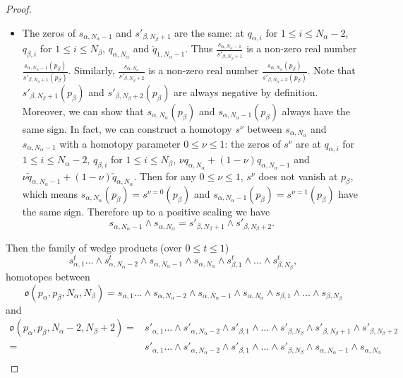 \documentclass[11pt,a4paper]{article}
\theoremstyle{definition}
\theoremstyle{remark}
\numberwithin{equation}{section}
\begin{document}
\begin{proof}
\begin{itemize}
        \item The zeros of $s_{\alpha,N_\alpha-1}$ and $s'_{\beta,N_\beta+1}$ are the same: at $q_{\alpha,i}$ for $1\le i \le N_\alpha-2$, $q_{\beta,i}$ for $1\le i \le N_\beta$, $q_{\alpha,N_\alpha}$ and $\check{q}_{1,N_\alpha-1}$. Thus $\frac{s_{\alpha,N_\alpha-1}}{s'_{\beta,N_\beta+1}}$ is a non-zero real number  $\frac{s_{\alpha,N_\alpha-1}(p_\beta)}{s'_{\beta,N_\beta+1}(p_\beta)}$. Similarly, $\frac{s_{\alpha,N_\alpha}}{s'_{\beta,N_\beta+2}}$ is a non-zero real number  $\frac{s_{\alpha,N_\alpha}(p_\beta)}{s'_{\beta,N_\beta+2}(p_\beta)}$. Note that $s'_{\beta,N_\beta+1}(p_\beta)$ and $s'_{\beta,N_\beta+2}(p_\beta)$ are always negative by definition. 
        Moreover, we can show that $s_{\alpha,N_\alpha}(p_\beta)$ and $s_{\alpha,N_\alpha-1}(p_\beta)$ always have the same sign. In fact, we can construct a homotopy $s^\nu$ between $s_{\alpha,N_\alpha}$ and $s_{\alpha,N_\alpha-1}$ with a homotopy parameter $0\le \nu \le 1$: the zeros of $s^\nu$ are at $q_{\alpha,i}$ for $1\le i \le N_\alpha-2$, $q_{\beta,i}$ for $1\le i \le N_\beta$, $\nu q_{\alpha,N_\alpha}+(1-\nu)q_{\alpha,N_\alpha-1}$ and $\nu\check{q}_{\alpha,N_\alpha-1}+(1-\nu)\check{q}_{\alpha,N_\alpha}$. 
        Then for any $0\le \nu \le 1$, $s^\nu$ does not vanish at $p_\beta$, which means $s_{\alpha,N_\alpha}(p_\beta)=s^{\nu=0}(p_\beta)$ and $s_{\alpha,N_\alpha-1}(p_\beta)=s^{\nu=1}(p_\beta)$ have the same sign. Therefore up to a positive scaling we have
        $$
        s_{\alpha,N_\alpha-1}\wedge s_{\alpha,N_\alpha}=s'_{\beta,N_\beta+1} \wedge s'_{\beta,N_\beta+2}.
        $$
    \end{itemize}
    Then the family of wedge products (over $0\le t \le 1$)
    $$
    s^t_{\alpha,1}\dots \wedge s^t_{\alpha,N_\alpha-2}\wedge s_{\alpha,N_\alpha-1}\wedge s_{\alpha,N_\alpha}\wedge s^t_{\beta,1}\wedge \dots \wedge s^t_{\beta,N_\beta},
    $$
    homotopes between 
    $$\mathfrak o(p_\alpha,p_\beta,N_\alpha,N_\beta)= s_{\alpha,1}\dots \wedge s_{\alpha,N_\alpha-2}\wedge s_{\alpha,N_\alpha-1}\wedge s_{\alpha,N_\alpha}\wedge s_{\beta,1}\wedge \dots \wedge s_{\beta,N_\beta}$$
    and 
    \begin{equation*}
    \begin{split}
        \mathfrak o(p_\alpha,p_\beta,N_\alpha-2,N_\beta+2)=& s'_{\alpha,1}\dots \wedge s'_{\alpha,N_\alpha-2}\wedge s'_{\beta,1}\wedge \dots \wedge s'_{\beta,N_\beta} \wedge s'_{\beta,N_\beta+1}\wedge s'_{\beta,N_\beta+2}\\
        =&s'_{\alpha,1}\dots \wedge s'_{\alpha,N_\alpha-2}\wedge s'_{\beta,1}\wedge \dots \wedge s'_{\beta,N_\beta} \wedge s_{\alpha,N_\alpha-1}\wedge s_{\alpha,N_\alpha}\\

\end{split}
\end{equation*}
\end{proof}
\end{document}
